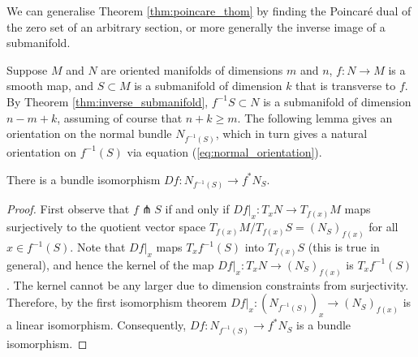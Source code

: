 We can generalise Theorem \ref{thm:poincare_thom} 
by finding the Poincar\'e dual of the zero set of an arbitrary section, or more
generally the inverse image of a submanifold.

Suppose $M$ and $N$ are oriented manifolds of dimensions $m$
and $n$, $f:N\to M$ is a smooth map, and
$S \subset M$ is a submanifold of dimension $k$ that is transverse to $f$. 
By Theorem \ref{thm:inverse_submanifold}, $f^{-1}S\subset N$ is a submanifold 
of dimension $n-m+k$, assuming of course that $n+k \geq m$. 
The following lemma gives an orientation on the normal
bundle $N_{f^{-1}(S)}$, which in turn gives a natural orientation on $f^{-1}(S)$
via equation (\ref{eq:normal_orientation}). 

\begin{lem} \label{lem:normal_isomorphism}
	There is a bundle isomorphism $Df : N_{f^{-1}(S)} \to f^*N_{S}$.
\end{lem}
\begin{proof}
	First observe that $f \pitchfork S$ if and only if  $Df|_x : T_x N \to
	T_{f(x)}M$ maps surjectively to the quotient vector space $T_{f(x)}M /T_{f(x)} S =
	(N_S)_{f(x)}$ for all $x\in f^{-1}(S)$. Note that $Df|_x$ maps
	$T_xf^{-1}(S)$ into $T_{f(x)}S$ (this is true in general), and hence
	the kernel of the map $Df|_x : T_x N \to (N_S)_{f(x)}$ is $T_xf^{-1}(S)$. 
	The kernel cannot be any larger due to dimension constraints from
	surjectivity. Therefore, by the first isomorphism theorem 
	$Df|_x : (N_{f^{-1}(S)})_x \to (N_S)_{f(x)}$ is a linear
	isomorphism. Consequently, 
	$Df : N_{f^{-1}(S)} \to f^*N_{S}$ is a bundle isomorphism. 
\end{proof}


